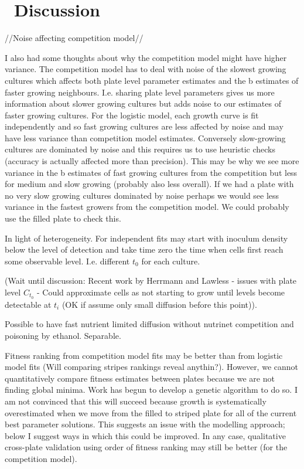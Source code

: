 \graphicspath{{images/}}

\section{\thesection~Discussion}
\label{sec:discussion}

//Noise affecting competition model//

I also had some thoughts about why the competition model might have
higher variance. The competition model has to deal with noise of the
slowest growing cultures which affects both plate level parameter
estimates and the b estimates of faster growing
neighbours. I.e. sharing plate level parameters gives us more
information about slower growing cultures but adds noise to our
estimates of faster growing cultures. For the logistic model, each
growth curve is fit independently and so fast growing cultures are
less affected by noise and may have less variance than competition
model estimates. Conversely slow-growing cultures are dominated by
noise and this requires us to use heuristic checks (accuracy is
actually affected more than precision). This may be why we see more
variance in the b estimates of fast growing cultures from the
competition but less for medium and slow growing (probably also less
overall). If we had a plate with no very slow growing cultures
dominated by noise perhaps we would see less variance in the fastest
growers from the competition model. We could probably use the filled
plate to check this.


In light of heterogeneity. For independent fits may start with
inoculum density below the level of detection and take time zero the
time when cells first reach some observable level. I.e. different
\(t_{0}\) for each culture.


(Wait until discussion: Recent work by Herrmann and Lawless - issues
with plate level \(C_{t_{0}}\) - Could approximate cells as not
starting to grow until levels become detectable at \(t_{i}\) (OK if
assume only small diffusion before this point)).



Possible to have fast nutrient limited diffusion without nutrinet
competition and poisoning by ethanol. Separable.


Fitness ranking from competition model fits may be better than from
logistic model fits (Will comparing stripes rankings reveal
anythin?). However, we cannot quantitatively compare fitness estimates
between plates because we are not finding global minima. Work has
begun to develop a genetic algorithm to do so. I am not convinced that
this will succeed because growth is systematically overestimated when
we move from the filled to striped plate for all of the current best
parameter solutions. This suggests an issue with the modelling
approach; below I suggest ways in which this could be improved. In
any case, qualitative cross-plate validation using order of fitness
ranking may still be better (for the competition model).


